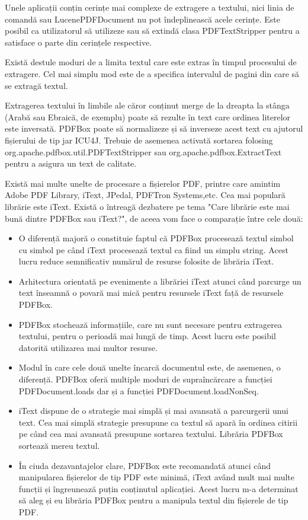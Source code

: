 \documentclass[12pt]{book}
\begin{document}
Unele aplicații conțin cerințe mai complexe de extragere a textului, nici linia de comandă sau LucenePDFDocument nu pot îndeplinească acele cerințe. Este posibil ca utilizatorul să utilizeze sau să extindă clasa PDFTextStripper pentru a satisface o parte din cerințele respective.

Există destule moduri de a limita textul care este extras în timpul procesului de extragere. Cel mai simplu mod este de a specifica intervalul de pagini din care să se extragă textul. 

Extragerea textului în limbile ale căror conținut merge de la dreapta la stânga  (Arabă sau Ebraică, de exemplu) poate să rezulte în text care ordinea literelor este inversată. PDFBox poate să normalizeze și să inverseze acest text cu ajutorul fișierului de tip jar ICU4J. Trebuie de asemenea activată sortarea folosing org.apache.pdfbox.util.PDFTextStripper sau org.apache.pdfbox.ExtractText pentru a asigura un text de calitate.

Există mai multe unelte de procesare a fișierelor PDF, printre care amintim Adobe PDF Library, iText, JPedal, PDFTron Systems,etc. Cea mai populară librărie este iText.
Există o întreagă dezbatere pe tema "Care librărie este mai bună dintre PDFBox sau iText?", de aceea vom face o comparație între cele două:
\begin{addmargin}[4em]{1em}
	\begin{itemize}
\item O diferență majoră o constituie faptul că PDFBox procesează textul simbol cu simbol pe când iText procesează textul ca fiind un simplu string. Acest lucru reduce semnificativ numărul de resurse folosite de librăria iText. 
\item Arhitectura orientată pe evenimente a librăriei iText atunci când parcurge un text înseamnă o povară mai mică pentru resursele iText față de resursele PDFBox.
\item PDFBox stochează informațiile, care nu sunt necesare pentru extragerea textului, pentru o perioadă mai lungă de timp. Acest lucru este posibil datorită utilizarea mai multor resurse.
\item Modul în care cele două unelte încarcă documentul este, de asemenea, o diferență. PDFBox oferă multiple moduri de supraîncărcare a funcției PDFDocument.loads dar și a funcției PDFDocument.loadNonSeq. 
\item iText dispune de o strategie mai simplă și mai avansată a parcurgerii unui text. Cea mai simplă strategie presupune ca textul să apară în ordinea citirii pe când cea mai avansată presupune sortarea textului. Librăria PDFBox sortează mereu textul. 
\item În ciuda dezavantajelor clare, PDFBox este recomandată atunci când manipularea fișierelor de tip PDF este minimă, iText având mult mai multe funcții și îngreunează puțin conținutul aplicației. Acest lucru m-a determinat să aleg și eu librăria PDFBox pentru a manipula textul din fișierele de tip PDF. \cite{PDFBoxOfficial}
\end{itemize}
\end{addmargin}
\end{document}

